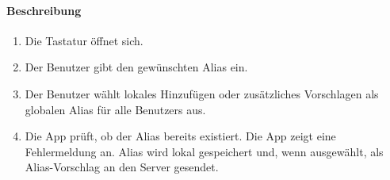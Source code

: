 \paragraph{Beschreibung}
\begin{enumerate}
    \item Die Tastatur öffnet sich.
    \item Der \Gls{Benutzer} gibt den gewünschten \Gls{Alias} ein.
    \item Der \Gls{Benutzer} wählt \gls{lokal}es Hinzufügen oder zusätzliches Vorschlagen als \gls{global}en \Gls{Alias} für alle \Glspl{Benutzer} aus.
    \item Die App prüft, ob der \Gls{Alias} bereits existiert.
     Die App zeigt eine Fehlermeldung an.
     \Gls{Alias} wird \gls{lokal} gespeichert und, wenn ausgewählt, als \Gls{Alias-Vorschlag} an den \Gls{Server} gesendet.
\end{enumerate}
